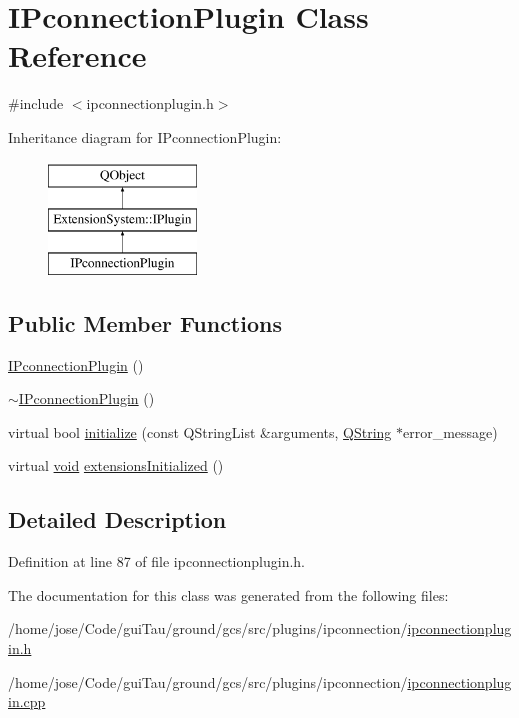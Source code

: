 \hypertarget{class_i_pconnection_plugin}{\section{I\-Pconnection\-Plugin Class Reference}
\label{class_i_pconnection_plugin}
}


{\ttfamily \#include $<$ipconnectionplugin.\-h$>$}

Inheritance diagram for I\-Pconnection\-Plugin\-:\begin{figure}[H]
\begin{center}
\leavevmode
\includegraphics[height=3.000000cm]{class_i_pconnection_plugin}
\end{center}
\end{figure}
\subsection*{Public Member Functions}
\begin{DoxyCompactItemize}
\item 
\hyperlink{group___i_p_conn_plugin_ga49199ecbe02c9b8fec0c2e0b1003d8ef}{I\-Pconnection\-Plugin} ()
\item 
\hyperlink{group___i_p_conn_plugin_gad46085821e644ad2a37cf2b6f79d0883}{$\sim$\-I\-Pconnection\-Plugin} ()
\item 
virtual bool \hyperlink{group___i_p_conn_plugin_ga66ca8127b859071b5c905aa9d0c22c55}{initialize} (const Q\-String\-List \&arguments, \hyperlink{group___u_a_v_objects_plugin_gab9d252f49c333c94a72f97ce3105a32d}{Q\-String} $\ast$error\-\_\-message)
\item 
virtual \hyperlink{group___u_a_v_objects_plugin_ga444cf2ff3f0ecbe028adce838d373f5c}{void} \hyperlink{group___i_p_conn_plugin_ga61e1d618e2d1914fd8190687cf0017a5}{extensions\-Initialized} ()
\end{DoxyCompactItemize}


\subsection{Detailed Description}


Definition at line 87 of file ipconnectionplugin.\-h.



The documentation for this class was generated from the following files\-:\begin{DoxyCompactItemize}
\item 
/home/jose/\-Code/gui\-Tau/ground/gcs/src/plugins/ipconnection/\hyperlink{ipconnectionplugin_8h}{ipconnectionplugin.\-h}\item 
/home/jose/\-Code/gui\-Tau/ground/gcs/src/plugins/ipconnection/\hyperlink{ipconnectionplugin_8cpp}{ipconnectionplugin.\-cpp}\end{DoxyCompactItemize}
